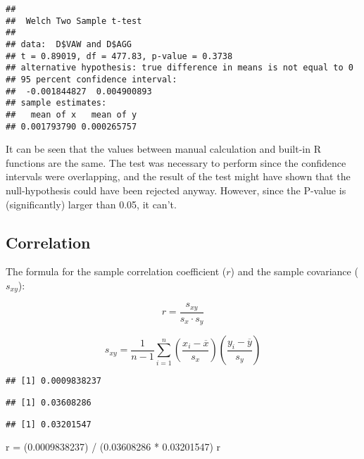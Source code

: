 \documentclass[
]{article}
\newenvironment{Shaded}{\begin{snugshade}}{\end{snugshade}}
\newcommand{\CommentTok}[1]{\textcolor[rgb]{0.56,0.35,0.01}{\textit{#1}}}
\newcommand{\FloatTok}[1]{\textcolor[rgb]{0.00,0.00,0.81}{#1}}
\newcommand{\FunctionTok}[1]{\textcolor[rgb]{0.00,0.00,0.00}{#1}}
\newcommand{\NormalTok}[1]{#1}
\newcommand{\OtherTok}[1]{\textcolor[rgb]{0.56,0.35,0.01}{#1}}
\newcommand{\SpecialCharTok}[1]{\textcolor[rgb]{0.00,0.00,0.00}{#1}}
\begin{document}
\begin{verbatim}
## 
##  Welch Two Sample t-test
## 
## data:  D$VAW and D$AGG
## t = 0.89019, df = 477.83, p-value = 0.3738
## alternative hypothesis: true difference in means is not equal to 0
## 95 percent confidence interval:
##  -0.001844827  0.004900893
## sample estimates:
##   mean of x   mean of y 
## 0.001793790 0.000265757
\end{verbatim}

It can be seen that the values between manual calculation and built-in R
functions are the same. The test was necessary to perform since the
confidence intervals were overlapping, and the result of the test might
have shown that the null-hypothesis could have been rejected anyway.
However, since the P-value is (significantly) larger than 0.05, it
can't.

\subsection{Correlation}

The formula for the sample correlation coefficient (\(r\)) and the
sample covariance (\(s_{xy}\)):

\[r = \frac{s_{xy}}{s_x \cdot s_y}\]

\[ s_{xy} = \frac{1}{n-1} \sum\limits_{i=1}^{n} \left( \frac{x_i-\overline{x}}{s_x} \right) \left(\frac{y_i-\overline{y}}{s_y} \right) \]

\begin{Shaded}
\end{Shaded}

\begin{verbatim}
## [1] 0.0009838237
\end{verbatim}

\begin{verbatim}
## [1] 0.03608286
\end{verbatim}

\begin{verbatim}
## [1] 0.03201547
\end{verbatim}

\begin{Shaded}
\begin{Highlighting}[]
\NormalTok{r }\OtherTok{=}\NormalTok{ (}\FloatTok{0.0009838237}\NormalTok{) }\SpecialCharTok{/}\NormalTok{ (}\FloatTok{0.03608286} \SpecialCharTok{*} \FloatTok{0.03201547}\NormalTok{)}
\NormalTok{r}
\end{Highlighting}
\end{Shaded}
\end{document}
